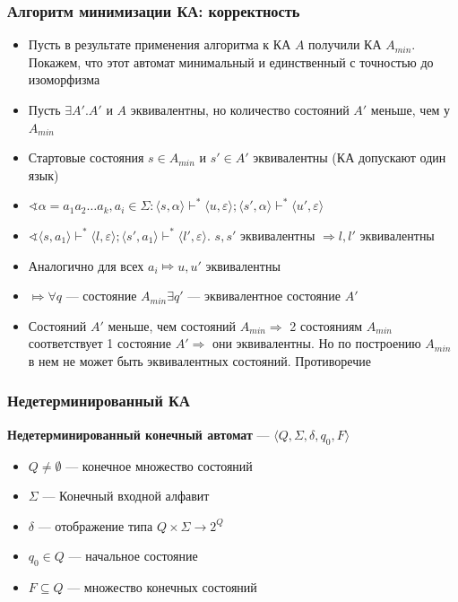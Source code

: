 \documentclass{beamer}
\begin{document}
\begin{frame}[fragile]
  \transwipe[direction=90]
  \frametitle{Алгоритм минимизации КА: корректность}   
    \begin{itemize}
      \item Пусть в результате применения алгоритма к КА $A$ получили КА $A_{min}$. Покажем, что этот автомат минимальный и единственный с точностью до изоморфизма
      \item Пусть $\exists A'. A'$ и $A$ эквивалентны, но количество состояний $A'$ меньше, чем у $A_{min}$
      \item Стартовые состояния $s \in A_{min}$ и $s' \in A'$ эквивалентны (КА допускают один язык)
      \item $\sphericalangle \alpha = a_1 a_2 \dots a_k, a_i \in \Sigma: \langle s, \alpha \rangle \vdash^* \langle u, \varepsilon \rangle; \langle s', \alpha \rangle \vdash^* \langle u', \varepsilon \rangle$
      \item $\sphericalangle \langle s, a_1 \rangle \vdash^* \langle l, \varepsilon \rangle; \langle s', a_1 \rangle \vdash^* \langle l', \varepsilon \rangle$. $s, s'$ эквивалентны $\Rightarrow l, l'$ эквивалентны
      \item Аналогично для всех $a_i \Mapsto u, u'$ эквивалентны 
      \item $\Mapsto \forall q$ --- состояние $A_{min} \exists q'$ --- эквивалентное состояние $A'$
      \item Состояний $A'$ меньше, чем состояний $A_{min} \Rightarrow$ 2 состояниям $A_{min}$ соответствует 1 состояние $A' \Rightarrow$ они эквивалентны. Но по построению $A_{min}$ в нем не может быть эквивалентных состояний. Противоречие
    \end{itemize}
    
\end{frame}

\begin{frame}[fragile]
  \transwipe[direction=90]
  \frametitle{Недетерминированный КА}   
 \textbf{Недетерминированный конечный автомат} --- $\langle Q, \Sigma, \delta, q_0, F \rangle$
  \begin{itemize}
    \item $Q \neq \emptyset$ --- конечное множество состояний
    \item $\Sigma$ --- Конечный входной алфавит
    \item $\delta$ --- отображение типа $Q \times \Sigma \rightarrow 2^Q$
    \item $q_0 \in Q$ --- начальное состояние
    \item $F \subseteq Q$ --- множество конечных состояний
  \end{itemize}
    
\end{frame}
\end{document}
